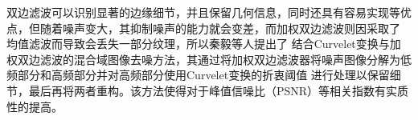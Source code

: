 双边滤波可以识别显著的边缘细节，并且保留几何信息，同时还具有容易实现等优点，但随着噪声变大，其抑制噪声的能力就会变差，而加权双边滤波则因采取了
均值滤波而导致会丢失一部分纹理，所以秦毅等人\cite{qinJieheCurveletbianhuanyujiaquanshuangbianlubodetuxiangquzaofangfa2021}提出了
结合Curvelet变换与加权双边滤波的混合域图像去噪方法，其通过将加权双边滤波器将噪声图像分解为低频部分和高频部分并对高频部分使用Curvelet变换的折衷阈值
进行处理以保留细节，最后再将两者重构。该方法使得对于峰值信噪比（PSNR）等相关指数有实质性的提高。

